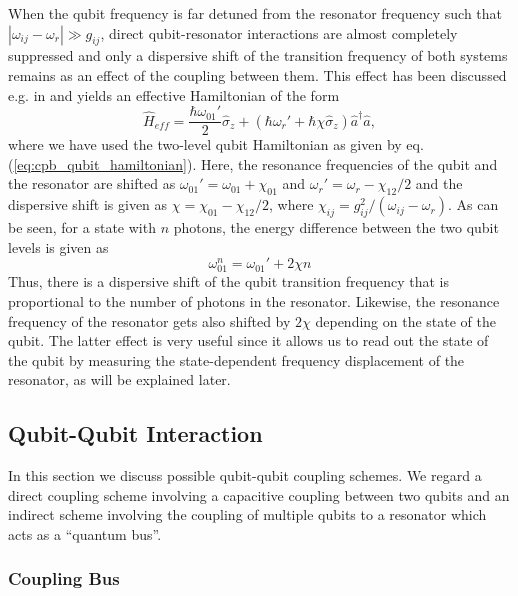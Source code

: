 When the qubit frequency is far detuned from the resonator frequency such that $|\omega_{ij}-\omega_r| \gg g_{ij}$, direct qubit-resonator interactions are almost completely suppressed and only a dispersive shift of the transition frequency of both systems remains as an effect of the coupling between them. This effect has been discussed e.g. in \cite{koch_charge-insensitive_2007} and yields an effective Hamiltonian of the form
%
\begin{equation}
\hat{H}_{eff} = \frac{\hbar\omega_{01}'}{2}\hat{\sigma}_z+(\hbar\omega_r'+\hbar \chi \hat{\sigma}_z)\hat{a}^\dagger \hat{a},
\end{equation}
%
where we have used the two-level qubit Hamiltonian as given by eq. (\ref{eq:cpb_qubit_hamiltonian}). Here, the resonance frequencies of the qubit and the resonator are shifted as $\omega_{01}'=\omega_{01}+\chi_{01}$ and $\omega_r' = \omega_{r}-\chi_{12}/2$ and the dispersive shift is given as $\chi=\chi_{01}-\chi_{12}/2$, where $\chi_{ij}=g_{ij}^2/(\omega_{ij}-\omega_r)$. As can be seen, for a state with $n$ photons, the energy difference between the two qubit levels is given as
%
\begin{equation}
\omega_{01}^n = \omega_{01}'+2\chi n
\end{equation}
%
Thus, there is a dispersive shift of the qubit transition frequency that is proportional to the number of photons in the resonator. Likewise, the resonance frequency of the resonator gets also shifted by $2\chi$ depending on the state of the qubit. The latter effect is very useful since it allows us to read out the state of the qubit by measuring the state-dependent frequency displacement of the resonator, as will be explained later.
\subsection{Qubit-Qubit Interaction}

In this section we discuss possible qubit-qubit coupling schemes. We regard a direct coupling scheme involving a capacitive coupling between two qubits and an indirect scheme involving the coupling of multiple qubits to a resonator which acts as a ``quantum bus''.

\subsubsection{Coupling Bus}


